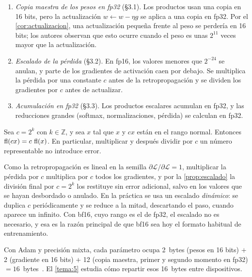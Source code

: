 \begin{enumerate}[label=(\arabic*)]
  \item \emph{Copia maestra de los pesos en fp32} (§3.1). Los productos usan una copia en 16 bits, pero la actualización $w\gets w-\eta g$ se aplica a una copia en fp32. Por el \cref{cor:actualizacion}, una actualización pequeña frente al peso se perdería en 16 bits; los autores observan que esto ocurre cuando el peso es unas $2^{11}$ veces mayor que la actualización.
  \item \emph{Escalado de la pérdida} (§3.2). En fp16, los valores menores que $2^{-24}$ se anulan, y parte de los gradientes de activación caen por debajo. Se multiplica la pérdida por una constante $c$ antes de la retropropagación y se dividen los gradientes por $c$ antes de actualizar.
  \item \emph{Acumulación en fp32} (§3.3). Los productos escalares acumulan en fp32, y las reducciones grandes (softmax, normalizaciones, pérdida) se calculan en fp32.
\end{enumerate}

\begin{proposicion}\label{prop:escalado}
Sea $c=2^{k}$ con $k\in\mathbb{Z}$, y sea $x$ tal que $x$ y $cx$ están en el rango normal. Entonces $\operatorname{fl}(cx)=c\,\operatorname{fl}(x)$. En particular, multiplicar y después dividir por $c$ un número representable no introduce error.
\end{proposicion}

Como la retropropagación es lineal en la semilla $\partial\mathcal{L}/\partial\mathcal{L}=1$, multiplicar la pérdida por $c$ multiplica por $c$ todos los gradientes, y por la \cref{prop:escalado} la división final por $c=2^{k}$ los restituye sin error adicional, salvo en los valores que se hayan desbordado o anulado. En la práctica se usa un escalado \emph{dinámico}: se duplica $c$ periódicamente y se reduce a la mitad, descartando el paso, cuando aparece un infinito. Con bf16, cuyo rango es el de fp32, el escalado no es necesario, y esa es la razón principal de que bf16 sea hoy el formato habitual de entrenamiento.

\begin{observacion}
Con Adam y precisión mixta, cada parámetro ocupa 2~bytes (pesos en 16 bits) $+$ 2 (gradiente en 16 bits) $+$ 12 (copia maestra, primer y segundo momento en fp32) $=16$~bytes~\cite[§3.1]{zero}. El \cref{tema:5} estudia cómo repartir esos 16~bytes entre dispositivos.
\end{observacion}


